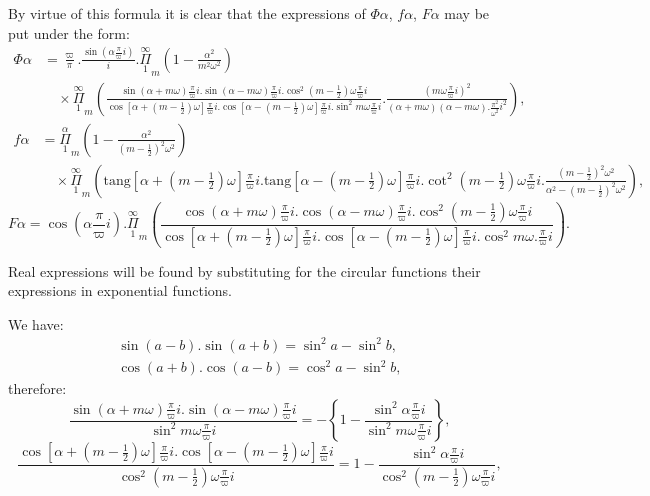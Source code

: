 \documentclass{article}
\begin{document}
By virtue of this formula it is clear that the expressions of $\Phi\alpha$, $f\alpha$, $F\alpha$ may be put under the form:
\[
\begin{aligned}
\Phi\alpha &= \frac{\varpi}{\pi}.\frac{\sin\left(\alpha\frac{\pi}{\varpi}i\right)}{i}.\overset{\infty}{\underset{1}{\Pi}}_{m}\left(1-\frac{\alpha^{2}}{m^{2}\omega^{2}}\right)\\
&\quad\times\overset{\infty}{\underset{1}{\Pi}}_{m}\left(\frac{\sin(\alpha+m\omega)\frac{\pi}{\varpi}i.\sin(\alpha-m\omega)\frac{\pi}{\varpi}i.\cos^{2}(m-\tfrac{1}{2})\omega\frac{\pi}{\varpi}i}{\cos[\alpha+(m-\tfrac{1}{2})\omega]\frac{\pi}{\varpi}i.\cos[\alpha-(m-\tfrac{1}{2})\omega]\frac{\pi}{\varpi}i.\sin^{2}m\omega\frac{\pi}{\varpi}i}.\frac{\left(m\omega\frac{\pi}{\varpi}i\right)^{2}}{(\alpha+m\omega)(\alpha-m\omega).\frac{\pi^{2}}{\omega^{2}}i^{2}}\right),
\end{aligned}
\]
\[
\begin{aligned}
f\alpha &= \overset{\alpha}{\underset{1}{\Pi}}_{m}\left(1-\frac{\alpha^{2}}{(m-\tfrac{1}{2})^{2}\omega^{2}}\right)\\
&\quad\times\overset{\infty}{\underset{1}{\Pi}}_{m}\left(\text{tang}[\alpha+(m-\tfrac{1}{2})\omega]\frac{\pi}{\varpi}i.\text{tang}[\alpha-(m-\tfrac{1}{2})\omega]\frac{\pi}{\varpi}i.\cot^{2}(m-\tfrac{1}{2})\omega\frac{\pi}{\varpi}i.\frac{(m-\tfrac{1}{2})^{2}\omega^{2}}{\alpha^{2}-(m-\tfrac{1}{2})^{2}\omega^{2}}\right),
\end{aligned}
\]
\[
F\alpha = \cos\left(\alpha\frac{\pi}{\varpi}i\right).\overset{\infty}{\underset{1}{\Pi}}_{m}\left(\frac{\cos(\alpha+m\omega)\frac{\pi}{\varpi}i.\cos(\alpha-m\omega)\frac{\pi}{\varpi}i.\cos^{2}(m-\tfrac{1}{2})\omega\frac{\pi}{\varpi}i}{\cos[\alpha+(m-\tfrac{1}{2})\omega]\frac{\pi}{\varpi}i.\cos[\alpha-(m-\tfrac{1}{2})\omega]\frac{\pi}{\varpi}i.\cos^{2}m\omega.\frac{\pi}{\varpi}i}\right).
\]

Real expressions will be found by substituting for the circular functions their expressions in exponential functions.

We have:
\[
\begin{gathered}
\sin(a-b).\sin(a+b) = \sin^{2}a-\sin^{2}b,\\
\cos(a+b).\cos(a-b) = \cos^{2}a-\sin^{2}b,
\end{gathered}
\]
therefore:
\[
\frac{\sin(\alpha+m\omega)\frac{\pi}{\varpi}i.\sin(\alpha-m\omega)\frac{\pi}{\varpi}i}{\sin^{2}m\omega\frac{\pi}{\varpi}i} = -\left\{1-\frac{\sin^{2}\alpha\frac{\pi}{\varpi}i}{\sin^{2}m\omega\frac{\pi}{\varpi}i}\right\},
\]
\[
\frac{\cos[\alpha+(m-\tfrac{1}{2})\omega]\frac{\pi}{\varpi}i.\cos[\alpha-(m-\tfrac{1}{2})\omega]\frac{\pi}{\varpi}i}{\cos^{2}(m-\tfrac{1}{2})\omega\frac{\pi}{\varpi}i} = 1-\frac{\sin^{2}\alpha\frac{\pi}{\varpi}i}{\cos^{2}(m-\tfrac{1}{2})\omega\frac{\pi}{\varpi}i},
\]
\end{document}
